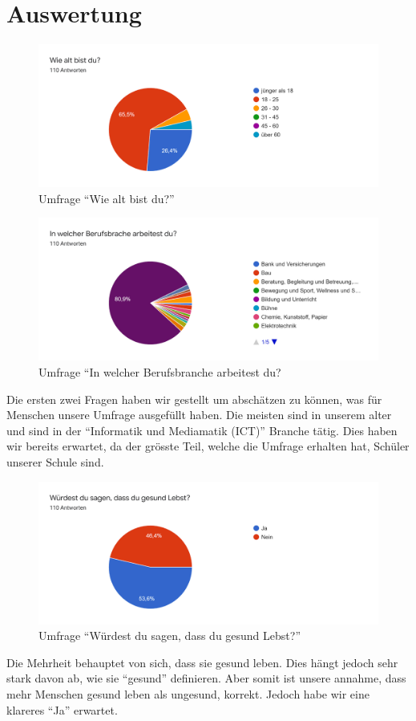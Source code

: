 \section{Auswertung}
\authortoc{\dario}{\sectionident}
\begin{figure}[H]
  \centering
  \includegraphics[width=0.7\linewidth]{./images/umfrage_a.png}
  \caption{Umfrage “Wie alt bist du?”}
  \label{fig:umfrage_a}
\end{figure}
\begin{figure}[H]
  \centering
  \includegraphics[width=0.7\linewidth]{./images/umfrage_b.png}
  \caption{Umfrage “In welcher Berufsbranche arbeitest du?}
  \label{fig:umfrage_b}
\end{figure}
Die ersten zwei Fragen haben wir gestellt um abschätzen zu können, was für Menschen unsere Umfrage ausgefüllt haben. Die meisten sind in unserem alter und sind in der “Informatik und Mediamatik (ICT)” Branche tätig. Dies haben wir bereits erwartet, da der grösste Teil, welche die Umfrage erhalten hat, Schüler unserer Schule sind.
\begin{figure}[H]
  \centering
  \includegraphics[width=0.7\linewidth]{./images/umfrage_c.png}
  \caption{Umfrage “Würdest du sagen, dass du gesund Lebst?”}
  \label{fig:umfrage_c}
\end{figure}
Die Mehrheit behauptet von sich, dass sie gesund leben. Dies hängt jedoch sehr stark davon ab, wie sie “gesund” definieren. Aber somit ist unsere annahme, dass mehr Menschen gesund leben als ungesund, korrekt. Jedoch habe wir eine klareres  “Ja” erwartet.
